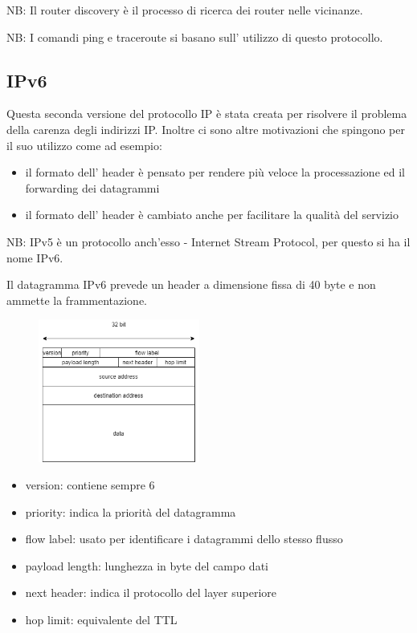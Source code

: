 NB: Il router discovery è il processo di ricerca dei router nelle vicinanze.

NB: I comandi ping e traceroute si basano sull' utilizzo di questo protocollo.

\subsection{IPv6}
Questa seconda versione del protocollo IP è stata creata per risolvere il problema della carenza degli indirizzi IP.
Inoltre ci sono altre motivazioni che spingono per il suo utilizzo come ad esempio:
\begin{itemize}
    \item il formato dell' header è pensato per rendere più veloce la processazione ed il forwarding dei datagrammi
    \item il formato dell' header è cambiato anche per facilitare la qualità del servizio
\end{itemize}
NB: IPv5 è un protocollo anch'esso - Internet Stream Protocol, per questo si ha il nome IPv6.

Il datagramma IPv6 prevede un header a dimensione fissa di 40 byte e non ammette la frammentazione.

\begin{figure}[H]
    \centering
    \includegraphics[width=200px]{images/5_Internetworking/IPv6_format.png}
\end{figure}
\begin{itemize}
    \item version: contiene sempre 6
    \item priority: indica la priorità del datagramma
    \item flow label: usato per identificare i datagrammi dello stesso flusso
    \item payload length: lunghezza in byte del campo dati
    \item next header: indica il protocollo del layer superiore
    \item hop limit: equivalente del TTL
\end{itemize}

